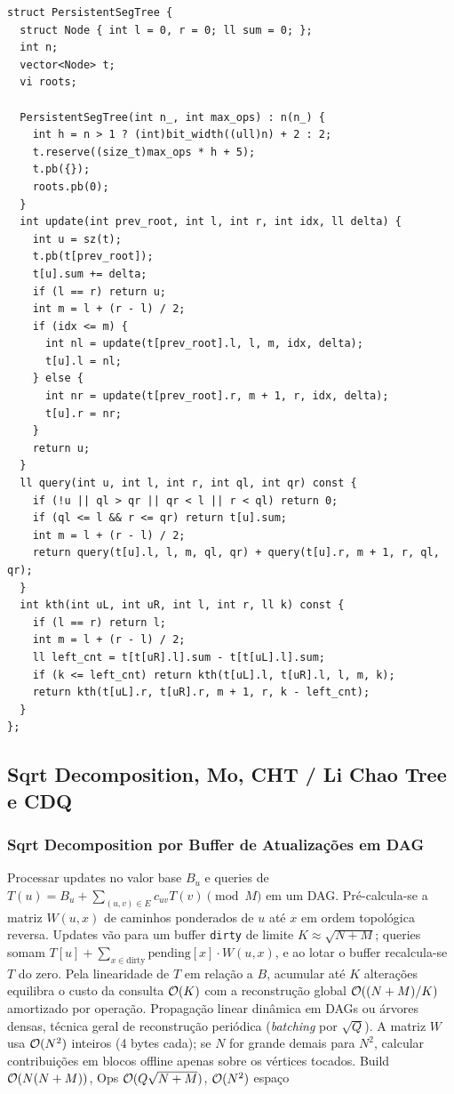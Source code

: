 \begin{lstlisting}
struct PersistentSegTree {
  struct Node { int l = 0, r = 0; ll sum = 0; };
  int n;
  vector<Node> t;
  vi roots;

  PersistentSegTree(int n_, int max_ops) : n(n_) {
    int h = n > 1 ? (int)bit_width((ull)n) + 2 : 2;
    t.reserve((size_t)max_ops * h + 5);
    t.pb({});
    roots.pb(0);
  }
  int update(int prev_root, int l, int r, int idx, ll delta) {
    int u = sz(t);
    t.pb(t[prev_root]);
    t[u].sum += delta;
    if (l == r) return u;
    int m = l + (r - l) / 2;
    if (idx <= m) {
      int nl = update(t[prev_root].l, l, m, idx, delta);
      t[u].l = nl;
    } else {
      int nr = update(t[prev_root].r, m + 1, r, idx, delta);
      t[u].r = nr;
    }
    return u;
  }
  ll query(int u, int l, int r, int ql, int qr) const {
    if (!u || ql > qr || qr < l || r < ql) return 0;
    if (ql <= l && r <= qr) return t[u].sum;
    int m = l + (r - l) / 2;
    return query(t[u].l, l, m, ql, qr) + query(t[u].r, m + 1, r, ql, qr);
  }
  int kth(int uL, int uR, int l, int r, ll k) const {
    if (l == r) return l;
    int m = l + (r - l) / 2;
    ll left_cnt = t[t[uR].l].sum - t[t[uL].l].sum;
    if (k <= left_cnt) return kth(t[uL].l, t[uR].l, l, m, k);
    return kth(t[uL].r, t[uR].r, m + 1, r, k - left_cnt);
  }
};
\end{lstlisting}

\subsection{Sqrt Decomposition, Mo, CHT / Li Chao Tree e CDQ}

\subsubsection{Sqrt Decomposition por Buffer de Atualizações em DAG}
\algobox
  {Processar updates no valor base $B_u$ e queries de $T(u) = B_u + \sum_{(u,v)\in E} c_{uv} T(v) \pmod M$ em um DAG.}
  {Pré-calcula-se a matriz $W(u, x)$ de caminhos ponderados de $u$ até $x$ em ordem topológica reversa. Updates vão para um buffer \texttt{dirty} de limite $K \approx \sqrt{N+M}$; queries somam $T[u] + \sum_{x \in \text{dirty}} \text{pending}[x] \cdot W(u, x)$, e ao lotar o buffer recalcula-se $T$ do zero.}
  {Pela linearidade de $T$ em relação a $B$, acumular até $K$ alterações equilibra o custo da consulta $\mathcal{O}(K)$ com a reconstrução global $\mathcal{O}((N+M)/K)$ amortizado por operação.}
  {Propagação linear dinâmica em DAGs ou árvores densas, técnica geral de reconstrução periódica (\emph{batching} por $\sqrt{Q}$).}
  {A matriz $W$ usa $\mathcal{O}(N^2)$ inteiros (4 bytes cada); se $N$ for grande demais para $N^2$, calcular contribuições em blocos offline apenas sobre os vértices tocados.}
  {Build $\mathcal{O}(N(N + M))$, Ops $\mathcal{O}(Q\sqrt{N + M})$, $\mathcal{O}(N^2)$ espaço}

